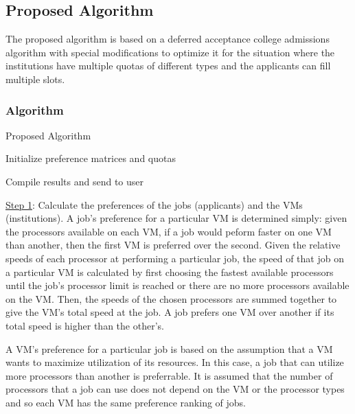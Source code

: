 \documentclass[conference]{IEEEtran}
\begin{document}
\subsection{Proposed Algorithm}
The proposed algorithm is based on a deferred acceptance
college admissions algorithm with special modifications to optimize it for 
the situation where the institutions have multiple quotas of different
types and the applicants can fill multiple slots.
\subsubsection{Algorithm}

\begin{algorithm}
\caption{Proposed Algorithm}\label{alg:PA}

Initialize preference matrices and quotas\;


Compile results and send to user\
\end{algorithm}
\underline{Step 1}: Calculate the preferences of the jobs (applicants) and the VMs
(institutions).
A job's preference for a particular VM is determined simply:
given the processors available on each VM, if a job would peform 
faster on one VM than another, then the first VM is preferred over the second. 
Given the relative speeds of each processor at performing a particular job,
the speed of that job on a particular VM is calculated by first choosing the fastest
available processors until the job's processor limit is reached or there are no more
processors available on the VM.
Then, the speeds of the chosen processors are summed together to give 
the VM's total speed at the job.
A job prefers one VM over another if its total speed
is higher than the other's. 

A VM's preference for a particular job is based on the assumption
that a VM wants to maximize utilization of its resources. 
In this case, a job that can utilize more processors than another
is preferrable. It is assumed that the number of processors that a job can use 
does not depend on the VM or the processor types and so each VM
has the same preference ranking of jobs.
\end{document}
